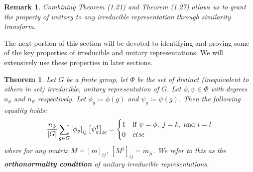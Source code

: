 \documentclass[10pt]{ucthesis}
\newtheorem{theorem}[definition]{Theorem}
\newtheorem{remark}[definition]{Remark}
\begin{document}
\begin{remark}
	Combining Theorem (1.21) and Theorem (1.27) allows us to grant the property of unitary to any irreducible representation through similarity transform. 
\end{remark}

The next portion of this section will be devoted to identifying and proving some of the key properties of irreducible and unitary representations. We will extensively use these properties in later sections.

\begin{theorem}
	Let $G$ be a finite group, let $\Phi$ be the set of distinct (inequivalent to others in set) irreducible, unitary representation of $G$. Let $\phi,\psi \in \Phi$ with degrees $n_{\phi}$ and $n_{\psi}$ respectively. Let $\phi_g \coloneq \phi(g)$ and $\psi_g \coloneq \psi(g)$. Then the following equality holds:
$$\frac{n_\phi}{|G|} \sum_{g\in G} \left[\phi_g \right]_{ij} \left[\psi_g^\dag \right]_{kl} = \begin{cases}
																						1 & \text{if } \psi = \phi,\hspace{1mm} j=k,\hspace{1mm} \text{and } i=l\\
																						0 & else
																					 \end{cases}$$
where for any matrix $M=\left[m\right]_{ij}$, $\left[M^\dag\right]_{ij} = \overline{m}_{ji} $. We refer to this as the \textbf{orthonormality condition} of unitary irreducible representations.
\end{theorem}
\end{document}
